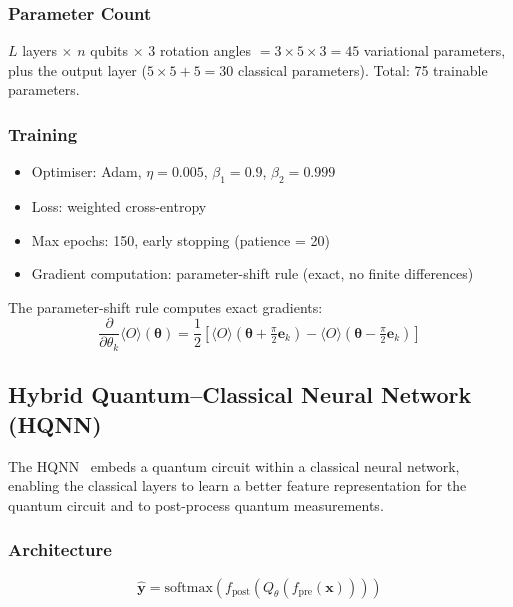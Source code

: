 \documentclass[journal]{IEEEtran}
\newcommand{\expect}[1]{\langle #1 \rangle}
\newcommand{\vect}[1]{\boldsymbol{#1}}
\begin{document}
\subsubsection{Parameter Count}

$L$ layers $\times$ $n$ qubits $\times$ 3 rotation angles $= 3 \times 5 \times 3 = 45$
variational parameters, plus the output layer ($5 \times 5 + 5 = 30$ classical
parameters). Total: 75 trainable parameters.

\subsubsection{Training}

\begin{itemize}
  \item Optimiser: Adam, $\eta = 0.005$, $\beta_1 = 0.9$, $\beta_2 = 0.999$
  \item Loss: weighted cross-entropy
  \item Max epochs: 150, early stopping (patience = 20)
  \item Gradient computation: parameter-shift rule (exact, no finite differences)
\end{itemize}

The parameter-shift rule computes exact gradients:
\begin{equation}
  \frac{\partial}{\partial \theta_k}\expect{O}(\vect{\theta}) =
  \frac{1}{2}\left[\expect{O}(\vect{\theta} + \tfrac{\pi}{2}\vect{e}_k) -
  \expect{O}(\vect{\theta} - \tfrac{\pi}{2}\vect{e}_k)\right]
\end{equation}

\subsection{Hybrid Quantum--Classical Neural Network (HQNN)}
\label{sec:hqnn}

The HQNN~\cite{mari2020transfer} embeds a quantum circuit within a classical
neural network, enabling the classical layers to learn a better feature
representation for the quantum circuit and to post-process quantum measurements.

\subsubsection{Architecture}

\begin{equation}
  \hat{\vect{y}} = \text{softmax}\!\left(f_{\text{post}}(Q_\theta(f_{\text{pre}}(\vect{x})))\right)
\end{equation}
\end{document}
